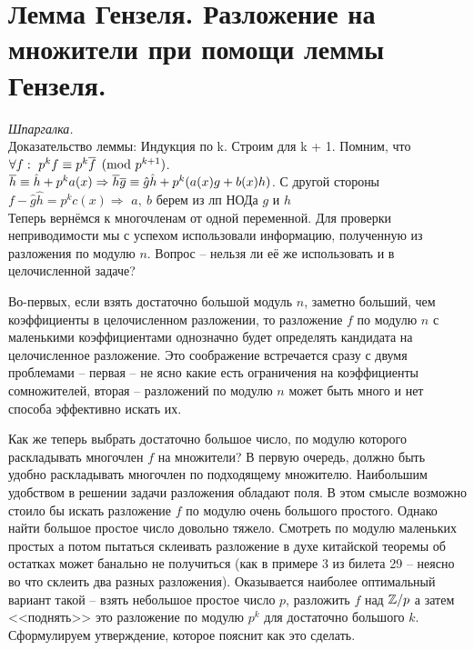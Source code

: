 \section{
 Лемма Гензеля. Разложение на множители при помощи леммы Гензеля.
}

{\it Шпаргалка.}\\
    Доказательство леммы: Индукция по k. Строим для k + 1. Помним, что $\forall f:~p^{k}f \equiv p^{k}\overline{f} \pmod{p^{k + 1}}$.\\
    $\overline{h} \equiv \hat{h}+p^ka(x) \Rightarrow \overline{h}\overline{g} \equiv \hat{g}\hat{h} + p^{k}(a(x)g + b(x)h)$. С другой стороны $f-\hat{g}\hat{h}=p^kc(x) \Rightarrow$ $a,~b$ берем из лп НОДа $g$ и $h$\\


Теперь вернёмся к многочленам от одной переменной. Для проверки неприводимости мы с успехом использовали информацию, полученную из разложения по модулю $n$. Вопрос -- нельзя ли её же использовать и в целочисленной задаче?

Во-первых, если взять достаточно большой модуль $n$, заметно больший, чем коэффициенты в целочисленном разложении, то разложение $f$ по модулю $n$ с маленькими коэффициентами однозначно будет определять кандидата на целочисленное разложение. Это соображение встречается сразу с двумя проблемами -- первая -- не ясно какие есть ограничения на коэффициенты сомножителей, вторая -- разложений по модулю $n$ может быть много и нет способа эффективно искать их.



Как же теперь выбрать достаточно большое число, по модулю которого раскладывать многочлен $f$ на множители? В первую очередь, должно быть удобно раскладывать многочлен по подходящему множителю. Наибольшим удобством в решении задачи разложения обладают поля. В этом смысле возможно стоило бы искать разложение $f$ по модулю очень большого простого. Однако найти большое простое число довольно тяжело. Смотреть по модулю маленьких простых а потом пытаться склеивать разложение в духе китайской теоремы об остатках может банально не получиться (как в примере 3 из билета 29 -- неясно во что склеить два разных разложения). Оказывается наиболее оптимальный вариант такой -- взять небольшое простое число $p$, разложить $f$ над $\mathbb{Z}/p$ а затем <<поднять>> это разложение по модулю $p^k$ для достаточно большого $k$. Сформулируем утверждение, которое пояснит как это сделать.

